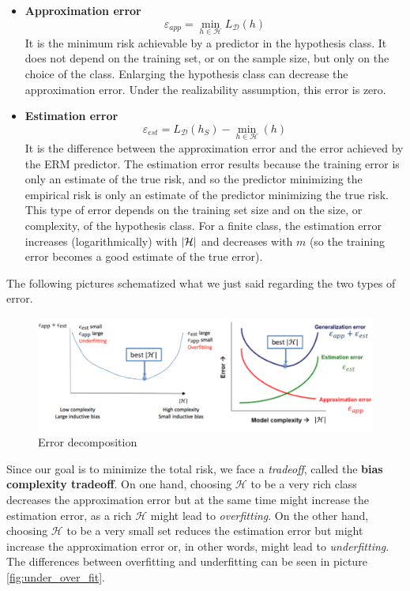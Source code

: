\documentclass[12pt]{report}
\theoremstyle{plain}
\newcommand\mcl[1]{\mathcal{#1}}
\begin{document}
\begin{flushleft}
\begin{itemize}
	\item \textbf{Approximation error}
	\[ \varepsilon_{app}=\min_{h\in\mcl{H}} L_\mcl{D}(h) \]
	It is the minimum risk achievable by a predictor in the hypothesis class. It does not depend on the training set, or on the sample size, but only on the choice of the class. Enlarging the hypothesis class can decrease the approximation error. Under the realizability assumption, this error is zero.
	\item \textbf{Estimation error}
	\[ \varepsilon_{est} = L_\mcl{D}(h_S) - \min_{h\in\mcl{H}}(h) \]
	It is the difference between the approximation error and the error achieved by the ERM predictor. The estimation error results because the training error is only an estimate of the true risk, and so the predictor minimizing the empirical risk is only an estimate of the predictor minimizing the true risk. This type of error depends on the training set size and on the size, or complexity, of the hypothesis class. For a finite class, the estimation error increases (logarithmically) with $\abs{\mcl{H}}$ and decreases with $m$ (so the training error becomes a good estimate of the true error).
\end{itemize}

The following pictures schematized what we just said regarding the two types of error.

\begin{figure}[!h]
	\centering
	\includegraphics[scale=0.5]{images/error_decomposition.pdf}
	\caption{Error decomposition}
	\label{fig:err_dec}
\end{figure}

Since our goal is to minimize the total risk, we face a \textit{tradeoff}, called the \textbf{bias complexity tradeoff}. On one hand, choosing $\mcl{H}$ to be a very rich class decreases the approximation error but at the same time might increase the estimation error, as a rich $\mcl{H}$ might lead to \textit{overfitting}. On the other hand, choosing $\mcl{H}$ to be a very small set reduces the estimation error but might increase the approximation error or, in other words, might lead to \textit{underfitting}.\\
The differences between overfitting and underfitting can be seen in picture \ref{fig:under_over_fit}.\\


\end{flushleft}
\end{document}
